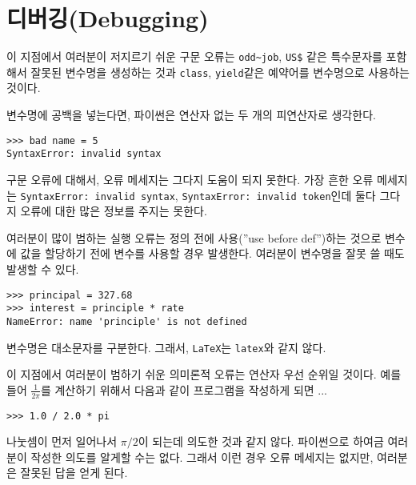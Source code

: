 \section{디버깅(Debugging)}

이 지점에서 여러분이 저지르기 쉬운 구문 오류는 \verb"odd~job", \verb"US$" 같은 특수문자를 포함해서 잘못된 변수명을 생성하는 것과 {\tt class}, {\tt yield}같은 예약어를 변수명으로 사용하는 것이다. 


변수명에 공백을 넣는다면, 파이썬은 연산자 없는 두 개의 피연산자로 생각한다.

\beforeverb
\begin{verbatim}
>>> bad name = 5
SyntaxError: invalid syntax
\end{verbatim}
\afterverb
%
구문 오류에 대해서, 오류 메세지는 그다지 도움이 되지 못한다. 
가장 흔한 오류 메세지는 {\tt SyntaxError: invalid syntax}, {\tt SyntaxError: invalid token}인데 둘다 그다지 오류에 대한 많은 정보를 주지는 못한다.


여러분이 많이 범하는 실행 오류는 정의 전에 사용(''use before def'')하는 것으로 변수에 값을 할당하기 전에 변수를 사용할 경우 발생한다. 여러분이 변수명을 잘못 쓸 때도 발생할 수 있다.

\beforeverb
\begin{verbatim}
>>> principal = 327.68
>>> interest = principle * rate
NameError: name 'principle' is not defined
\end{verbatim}
\afterverb
%
변수명은 대소문자를 구분한다. 그래서, {\tt LaTeX}는 {\tt latex}와 같지 않다.


이 지점에서 여러분이 범하기 쉬운 의미론적 오류는 연산자 우선 순위일 것이다. 
예를 들어 $\frac{1}{2 \pi}$를 계산하기 위해서 다음과 같이 프로그램을 작성하게 되면 ...


\beforeverb
\begin{verbatim}
>>> 1.0 / 2.0 * pi
\end{verbatim}
\afterverb
%
나눗셈이 먼저 일어나서 $\pi / 2$이 되는데 의도한 것과 같지 않다. 
파이썬으로 하여금 여러분이 작성한 의도를 알게할 수는 없다. 
그래서 이런 경우 오류 메세지는 없지만, 여러분은 잘못된 답을 얻게 된다.

